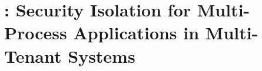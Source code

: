 
\chapter{\systemname{}: Security Isolation for Multi-Process Applications in Multi-Tenant Systems}










